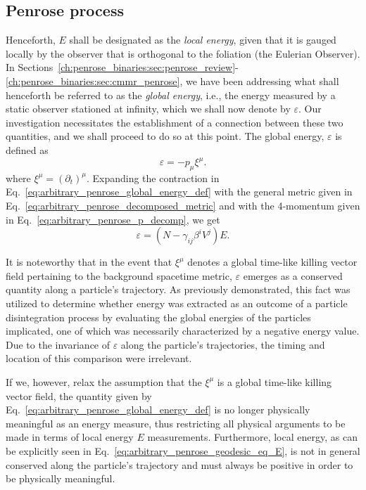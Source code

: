 \subsection{Penrose process}

Henceforth, $E$ shall be designated as the \emph{local energy}, given that it is gauged locally by the observer that is orthogonal to the foliation (the Eulerian Observer). In Sections~\ref{ch:penrose_binaries:sec:penrose_review}-\ref{ch:penrose_binaries:sec:cmmr_penrose}, we have been addressing what shall henceforth be referred to as the \emph{global energy}, i.e., the energy measured by a static observer stationed at infinity, which we shall now denote by $\varepsilon$. Our investigation necessitates the establishment of a connection between these two quantities, and we shall proceed to do so at this point. The global energy, $\varepsilon$ is defined as
%
\begin{equation}
  \varepsilon = - p_\mu \xi^\mu.
  \label{eq:arbitrary_penrose_global_energy_def}
\end{equation}
%
where $\xi^\mu = (\partial_t)^\mu$.
%
Expanding the contraction in Eq.~\eqref{eq:arbitrary_penrose_global_energy_def} with the general metric given in Eq.~\eqref{eq:arbitrary_penrose_decomposed_metric} and with the 4-momentum given in Eq.~\eqref{eq:arbitrary_penrose_p_decomp}, we get
%
\begin{equation}
  \varepsilon = \left( N - \gamma_{ij} \beta^i V^j \right) E.
  \label{eq:arbitrary_penrose_local_global_energy_relation}
\end{equation}

It is noteworthy that in the event that $\xi^\mu$ denotes a global time-like killing vector field pertaining to the background spacetime metric, $\varepsilon$ emerges as a conserved quantity along a particle's trajectory. As previously demonstrated, this fact was utilized to determine whether energy was extracted as an outcome of a particle disintegration process by evaluating the global energies of the particles implicated, one of which was necessarily characterized by a negative energy value. Due to the invariance of $\varepsilon$ along the particle's trajectories, the timing and location of this comparison were irrelevant.

If we, however, relax the assumption that the $\xi^\mu$ is a global time-like killing vector field, the quantity given by Eq.~\eqref{eq:arbitrary_penrose_global_energy_def} is no longer physically meaningful as an energy measure, thus restricting all physical arguments to be made in terms of local energy $E$ measurements. Furthermore, local energy, as can be explicitly seen in Eq.~\eqref{eq:arbitrary_penrose_geodesic_eq_E}, is not in general conserved along the particle's trajectory and must always be positive in order to be physically meaningful.

